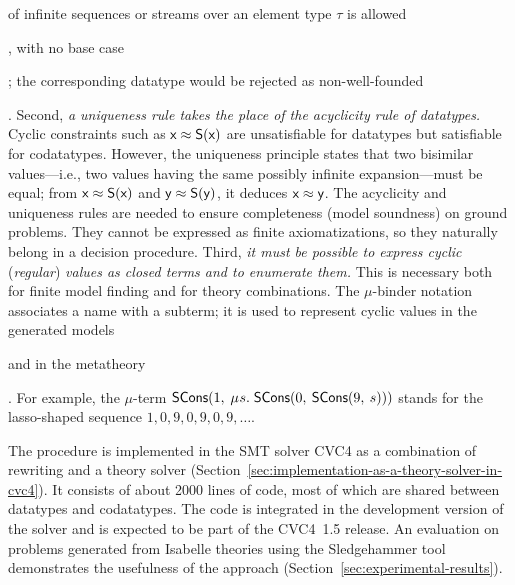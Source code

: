 \noindent
of infinite sequences or streams over an element type $\tau$ is
allowed\begin{conf}, with no base case\end{conf}\begin{rep}; the
corresponding datatype would be rejected as non-well-founded
\cite{blanchette-et-al-2015-esop}\end{rep}.
%
Second, \emph{a uniqueness rule takes the place of the acyclicity rule of datatypes.}
Cyclic constraints such as
$\textsf{x} \approx \textsf{S}(\textsf{x})$ %
are unsatisfiable for datatypes but satisfiable for codatatypes.
However, the uniqueness principle states that two bisimilar values---i.e., two values
having the same possibly infinite expansion---must be equal; from $\textsf{x}
\approx \textsf{S}(\textsf{x})$ and
$\textsf{y} \approx \textsf{S}(\textsf{y})$, it deduces $\textsf{x} \approx \textsf{y}$.
The acyclicity and uniqueness rules are needed to ensure completeness
(model soundness) on ground problems. %
They cannot be expressed as finite axiomatizations, so they naturally belong in
a decision procedure.
%
Third, \emph{it must be possible to express cyclic }(\emph{regular}) \emph{values as closed terms and
to enumerate them.} This is necessary both for finite model finding
and for theory combinations. The $\mu$-binder notation associates a name with
a subterm; it is used to represent cyclic values in the generated
models\begin{rep} and in the metatheory\end{rep}. For example,
the $\mu$-term $\const{SCons}(1,\: \MU s.\; \const{SCons}(0,\: \const{SCons}(9,\: s)))$
stands for the lasso-shaped sequence $1, 0, 9, 0, 9, 0, 9,
\ldots$\afterLdots.


The procedure is implemented in the SMT solver CVC4 \cite{barrett-et-al-2011} as a combination
of rewriting and a theory solver (Section~\ref{sec:implementation-as-a-theory-solver-in-cvc4}).
It consists of about 2000 lines of \cpp{} code, %
most of which are shared between datatypes and codatatypes. The code is
integrated in the development version of the solver and is expected to be part
of the CVC4~1.5 release.
%
An evaluation on %
problems generated from Isabelle theories using the Sledgehammer tool \cite{paulson-blanchette-2010}
demonstrates the usefulness of the approach (Section~\ref{sec:experimental-results}).

